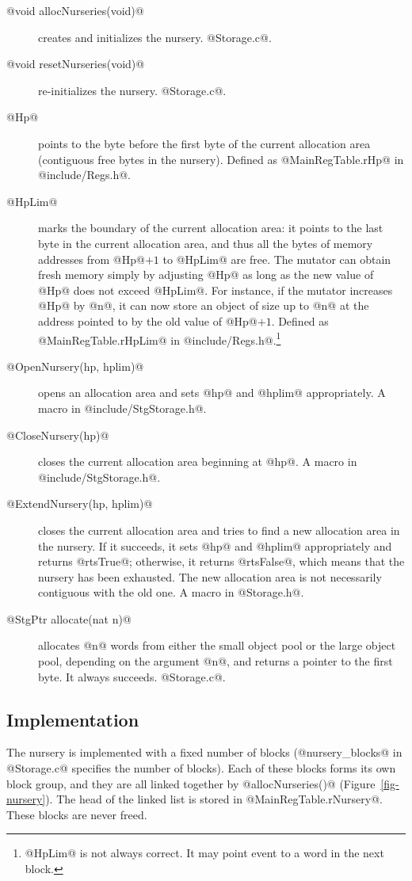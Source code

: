 \documentclass{article}
\begin{document}
\begin{description}
\item[@void allocNurseries(void)@] creates and initializes the nursery. 
@Storage.c@.
\item[@void resetNurseries(void)@] re-initializes the nursery. @Storage.c@.
\item[@Hp@] points to the byte before the first byte of the current allocation area 
(contiguous free bytes in the nursery). 
Defined as @MainRegTable.rHp@ in @include/Regs.h@.
\item[@HpLim@] marks the boundary of the current allocation area:
it points to the last byte in the current allocation area, and thus
all the bytes of memory addresses from @Hp@$ + 1$ to @HpLim@ are free.
The mutator can obtain fresh memory simply by adjusting @Hp@ as long as the new
value of @Hp@ does not exceed @HpLim@. For instance, if the mutator 
increases @Hp@ by @n@, it can now store an object of size up to @n@ at the 
address pointed to by the old value of @Hp@$ + 1$.
Defined as @MainRegTable.rHpLim@ in @include/Regs.h@.\footnote{@HpLim@ is not always
correct. It may point event to a word in the next block.}
\item[@OpenNursery(hp, hplim)@] opens an allocation area and sets @hp@ and 
@hplim@ appropriately. A macro in @include/StgStorage.h@.
\item[@CloseNursery(hp)@] closes the current allocation area beginning at @hp@.
A macro in @include/StgStorage.h@.
\item[@ExtendNursery(hp, hplim)@] closes the current allocation area and 
tries to find a new allocation area in the nursery. 
If it succeeds, it sets @hp@ and @hplim@ appropriately and returns @rtsTrue@; 
otherwise, it returns @rtsFalse@,
which means that the nursery has been exhausted. 
The new allocation area is not necessarily contiguous with the old one.
A macro in @Storage.h@.
\item[@StgPtr allocate(nat n)@] allocates @n@ words from either the small
object pool or the large object pool, depending on the argument @n@, 
and returns a pointer to the first byte. It always succeeds.
@Storage.c@.
\end{description}

\subsection{Implementation}

The nursery is implemented with a fixed number of blocks (@nursery_blocks@
in @Storage.c@ specifies the number of blocks). 
Each of these blocks forms its own block group, and they are all linked together
by @allocNurseries()@ (Figure~\ref{fig-nursery}).
The head of the linked list is stored in @MainRegTable.rNursery@.
These blocks are never freed. 
\end{document}
